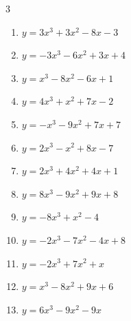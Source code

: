 \begin{multicols}{3}
\begin{enumerate}
  \item $y=3x^{3}+3x^{2}-8x-3$


  \item $y=-3x^{3}-6x^{2}+3x+4$


  \item $y=x^{3}-8x^{2}-6x+1$


  \item $y=4x^{3}+x^{2}+7x-2$


  \item $y=-x^{3}-9x^{2}+7x+7$


  \item $y=2x^{3}-x^{2}+8x-7$


\columnbreak %

  \item $y=2x^{3}+4x^{2}+4x+1$


  \item $y=8x^{3}-9x^{2}+9x+8$


  \item $y=-8x^{3}+x^{2}-4$


  \item $y=-2x^{3}-7x^{2}-4x+8$


  \item $y=-2x^{3}+7x^{2}+x$


  \item $y=x^{3}-8x^{2}+9x+6$


  \item $y=6x^{3}-9x^{2}-9x$


\end{enumerate}
\end{multicols}

